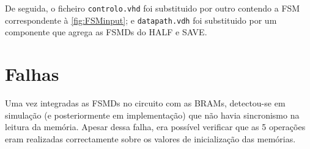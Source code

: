 \documentclass[a4paper]{article}
\begin{document}
De seguida, o ficheiro \texttt{controlo.vhd} foi substituido por outro contendo a FSM correspondente à \autoref{fig:FSMinput}; e \texttt{datapath.vdh} foi substituido por um componente que agrega as FSMDs do HALF e SAVE.

\section{Falhas}

Uma vez integradas as FSMDs no circuito com as BRAMs, detectou-se em simulação (e posteriormente em implementação) que não havia sincronismo na leitura da memória. Apesar dessa falha, era possível verificar que as 5 operações eram realizadas correctamente sobre os valores de inicialização das memórias.
\end{document}
